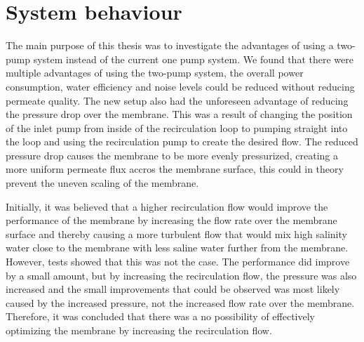 

\section{System behaviour} 




The main purpose of this thesis was to investigate the advantages of using a two-pump system instead of the current one pump system. We found that there were multiple advantages of using the two-pump system, the overall power consumption, water efficiency and noise levels could be reduced without reducing permeate quality. The new setup also had the unforeseen advantage of reducing the pressure drop over the membrane. This was a result of changing the position of the inlet pump from inside of the recirculation loop to pumping straight into the loop and using the recirculation pump to create the desired flow. The reduced pressure drop causes the membrane to be more evenly pressurized, creating a more uniform permeate flux accros the membrane surface, this could in theory prevent the uneven scaling of the membrane.

Initially, it was believed that a higher recirculation flow would improve the performance of the membrane by increasing the flow rate over the membrane surface and thereby causing a more turbulent flow that would mix high salinity water close to the membrane with less saline water further from the membrane. However, tests showed that this was not the case. The performance did improve by a small amount, but by increasing the recirculation flow, the pressure was also increased and the small improvements that could be observed was most likely caused by the increased pressure, not the increased flow rate over the membrane. Therefore, it was concluded that there was a no possibility of effectively optimizing the membrane by increasing the recirculation flow. 

